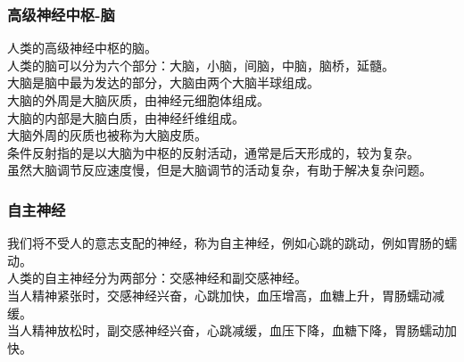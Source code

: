 \documentclass[UTF8]{ctexart}
\begin{document}
\newpage

\subsubsection{高级神经中枢-脑}
    人类的高级神经中枢的脑。\\[3mm]
    人类的脑可以分为六个部分：大脑，小脑，间脑，中脑，脑桥，延髓。\\[3mm]
    大脑是脑中最为发达的部分，大脑由两个大脑半球组成。\\[3mm]
    大脑的外周是大脑灰质，由神经元细胞体组成。\\[3mm]
    大脑的内部是大脑白质，由神经纤维组成。\\[3mm]
    大脑外周的灰质也被称为大脑皮质。\\[6mm]
    条件反射指的是以大脑为中枢的反射活动，通常是后天形成的，较为复杂。\\[3mm]
    虽然大脑调节反应速度慢，但是大脑调节的活动复杂，有助于解决复杂问题。

\subsubsection{自主神经}
    我们将不受人的意志支配的神经，称为自主神经，例如心跳的跳动，例如胃肠的蠕动。\\[3mm]
    人类的自主神经分为两部分：交感神经和副交感神经。\\[3mm]
    当人精神紧张时，交感神经兴奋，心跳加快，血压增高，血糖上升，胃肠蠕动减缓。\\[3mm]
    当人精神放松时，副交感神经兴奋，心跳减缓，血压下降，血糖下降，胃肠蠕动加快。\\
\end{document}
